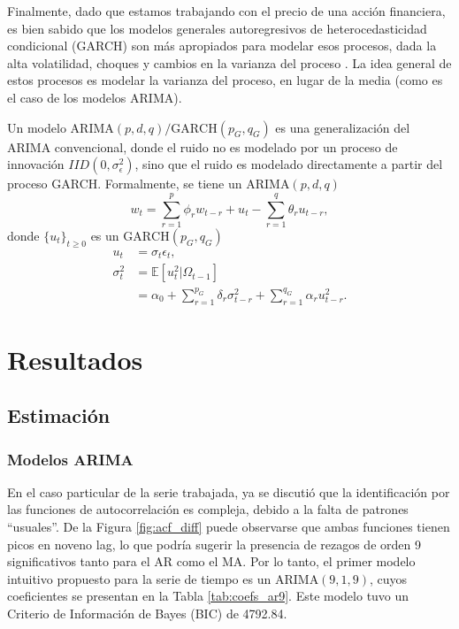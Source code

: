 \documentclass[conference]{IEEEtran}
\begin{document}
Finalmente, dado que estamos trabajando con el precio de una acción financiera, es bien sabido que los modelos generales autoregresivos de heterocedasticidad condicional (GARCH) son más apropiados para modelar esos procesos, dada la alta volatilidad, choques y cambios en la varianza del proceso \cite{ruppert2011}. La idea general de estos procesos es modelar la varianza del proceso, en lugar de la media (como es el caso de los modelos ARIMA).

Un modelo $\mathrm{ARIMA}(p,d,q)/\mathrm{GARCH}(p_G, q_G)$ es una generalización del ARIMA convencional, donde el ruido no es modelado por un proceso de innovación $IID(0,\sigma^2_\epsilon)$, sino que el ruido es modelado directamente a partir del proceso GARCH. Formalmente, se tiene un $\mathrm{ARIMA}(p,d,q)$
\begin{equation}
    w_t=\sum_{r=1}^p\phi_rw_{t-r}+u_t-\sum_{r=1}^q\theta_ru_{t-r},
\end{equation}
donde $\{u_t\}_{t\geq0}$ es un $\mathrm{GARCH}(p_G, q_G)$
\begin{align*}
    u_t&=\sigma_t\epsilon_t,\\
    \sigma_t^2&=\mathbb{E}\left[u^2_t|\Omega_{t-1}\right]\\
    &=\alpha_0+\sum_{r=1}^{p_G}\delta_r\sigma^2_{t-r} + \sum_{r=1}^{q_G}\alpha_ru^2_{t-r}.
\end{align*}

\section{Resultados}
\subsection{Estimación}
\subsubsection{Modelos ARIMA}
En el caso particular de la serie trabajada, ya se discutió que la identificación por las funciones de autocorrelación es compleja, debido a la falta de patrones ``usuales''. De la Figura \ref{fig:acf_diff} puede observarse que ambas funciones tienen picos en noveno lag, lo que podría sugerir la presencia de rezagos de orden 9 significativos tanto para el AR como el MA. Por lo tanto, el primer modelo intuitivo propuesto para la serie de tiempo es un $\mathrm{ARIMA}(9,1,9)$, cuyos coeficientes se presentan en la Tabla \ref{tab:coefs_ar9}. Este modelo tuvo un Criterio de Información de Bayes (BIC) de 4792.84.
\end{document}

